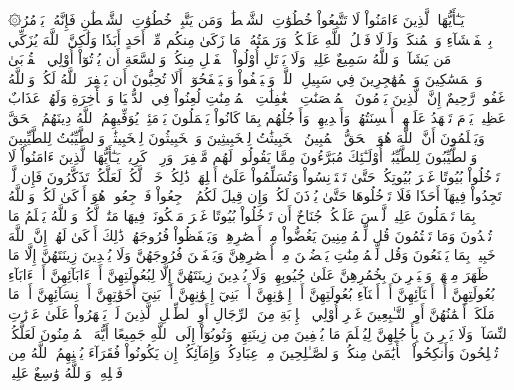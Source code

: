 ۞يَـٰٓأَيُّهَا ٱلَّذِينَ ءَامَنُواْ لَا تَتَّبِعُواْ خُطُوَٰتِ ٱلشَّيۡطَٰنِۚ وَمَن يَتَّبِعۡ خُطُوَٰتِ ٱلشَّيۡطَٰنِ فَإِنَّهُۥ يَأۡمُرُ بِٱلۡفَحۡشَآءِ وَٱلۡمُنكَرِۚ وَلَوۡلَا فَضۡلُ ٱللَّهِ عَلَيۡكُمۡ وَرَحۡمَتُهُۥ مَا زَكَىٰ مِنكُم مِّنۡ أَحَدٍ أَبَدٗا وَلَٰكِنَّ ٱللَّهَ يُزَكِّي مَن يَشَآءُۗ وَٱللَّهُ سَمِيعٌ عَلِيمٞ
وَلَا يَأۡتَلِ أُوْلُواْ ٱلۡفَضۡلِ مِنكُمۡ وَٱلسَّعَةِ أَن يُؤۡتُوٓاْ أُوْلِي ٱلۡقُرۡبَىٰ وَٱلۡمَسَٰكِينَ وَٱلۡمُهَٰجِرِينَ فِي سَبِيلِ ٱللَّهِۖ وَلۡيَعۡفُواْ وَلۡيَصۡفَحُوٓاْۗ أَلَا تُحِبُّونَ أَن يَغۡفِرَ ٱللَّهُ لَكُمۡۚ وَٱللَّهُ غَفُورٞ رَّحِيمٌ
إِنَّ ٱلَّذِينَ يَرۡمُونَ ٱلۡمُحۡصَنَٰتِ ٱلۡغَٰفِلَٰتِ ٱلۡمُؤۡمِنَٰتِ لُعِنُواْ فِي ٱلدُّنۡيَا وَٱلۡأٓخِرَةِ وَلَهُمۡ عَذَابٌ عَظِيمٞ
يَوۡمَ تَشۡهَدُ عَلَيۡهِمۡ أَلۡسِنَتُهُمۡ وَأَيۡدِيهِمۡ وَأَرۡجُلُهُم بِمَا كَانُواْ يَعۡمَلُونَ
يَوۡمَئِذٖ يُوَفِّيهِمُ ٱللَّهُ دِينَهُمُ ٱلۡحَقَّ وَيَعۡلَمُونَ أَنَّ ٱللَّهَ هُوَ ٱلۡحَقُّ ٱلۡمُبِينُ
ٱلۡخَبِيثَٰتُ لِلۡخَبِيثِينَ وَٱلۡخَبِيثُونَ لِلۡخَبِيثَٰتِۖ وَٱلطَّيِّبَٰتُ لِلطَّيِّبِينَ وَٱلطَّيِّبُونَ لِلطَّيِّبَٰتِۚ أُوْلَـٰٓئِكَ مُبَرَّءُونَ مِمَّا يَقُولُونَۖ لَهُم مَّغۡفِرَةٞ وَرِزۡقٞ كَرِيمٞ
يَـٰٓأَيُّهَا ٱلَّذِينَ ءَامَنُواْ لَا تَدۡخُلُواْ بُيُوتًا غَيۡرَ بُيُوتِكُمۡ حَتَّىٰ تَسۡتَأۡنِسُواْ وَتُسَلِّمُواْ عَلَىٰٓ أَهۡلِهَاۚ ذَٰلِكُمۡ خَيۡرٞ لَّكُمۡ لَعَلَّكُمۡ تَذَكَّرُونَ
فَإِن لَّمۡ تَجِدُواْ فِيهَآ أَحَدٗا فَلَا تَدۡخُلُوهَا حَتَّىٰ يُؤۡذَنَ لَكُمۡۖ وَإِن قِيلَ لَكُمُ ٱرۡجِعُواْ فَٱرۡجِعُواْۖ هُوَ أَزۡكَىٰ لَكُمۡۚ وَٱللَّهُ بِمَا تَعۡمَلُونَ عَلِيمٞ
لَّيۡسَ عَلَيۡكُمۡ جُنَاحٌ أَن تَدۡخُلُواْ بُيُوتًا غَيۡرَ مَسۡكُونَةٖ فِيهَا مَتَٰعٞ لَّكُمۡۚ وَٱللَّهُ يَعۡلَمُ مَا تُبۡدُونَ وَمَا تَكۡتُمُونَ
قُل لِّلۡمُؤۡمِنِينَ يَغُضُّواْ مِنۡ أَبۡصَٰرِهِمۡ وَيَحۡفَظُواْ فُرُوجَهُمۡۚ ذَٰلِكَ أَزۡكَىٰ لَهُمۡۚ إِنَّ ٱللَّهَ خَبِيرُۢ بِمَا يَصۡنَعُونَ
وَقُل لِّلۡمُؤۡمِنَٰتِ يَغۡضُضۡنَ مِنۡ أَبۡصَٰرِهِنَّ وَيَحۡفَظۡنَ فُرُوجَهُنَّ وَلَا يُبۡدِينَ زِينَتَهُنَّ إِلَّا مَا ظَهَرَ مِنۡهَاۖ وَلۡيَضۡرِبۡنَ بِخُمُرِهِنَّ عَلَىٰ جُيُوبِهِنَّۖ وَلَا يُبۡدِينَ زِينَتَهُنَّ إِلَّا لِبُعُولَتِهِنَّ أَوۡ ءَابَآئِهِنَّ أَوۡ ءَابَآءِ بُعُولَتِهِنَّ أَوۡ أَبۡنَآئِهِنَّ أَوۡ أَبۡنَآءِ بُعُولَتِهِنَّ أَوۡ إِخۡوَٰنِهِنَّ أَوۡ بَنِيٓ إِخۡوَٰنِهِنَّ أَوۡ بَنِيٓ أَخَوَٰتِهِنَّ أَوۡ نِسَآئِهِنَّ أَوۡ مَا مَلَكَتۡ أَيۡمَٰنُهُنَّ أَوِ ٱلتَّـٰبِعِينَ غَيۡرِ أُوْلِي ٱلۡإِرۡبَةِ مِنَ ٱلرِّجَالِ أَوِ ٱلطِّفۡلِ ٱلَّذِينَ لَمۡ يَظۡهَرُواْ عَلَىٰ عَوۡرَٰتِ ٱلنِّسَآءِۖ وَلَا يَضۡرِبۡنَ بِأَرۡجُلِهِنَّ لِيُعۡلَمَ مَا يُخۡفِينَ مِن زِينَتِهِنَّۚ وَتُوبُوٓاْ إِلَى ٱللَّهِ جَمِيعًا أَيُّهَ ٱلۡمُؤۡمِنُونَ لَعَلَّكُمۡ تُفۡلِحُونَ
وَأَنكِحُواْ ٱلۡأَيَٰمَىٰ مِنكُمۡ وَٱلصَّـٰلِحِينَ مِنۡ عِبَادِكُمۡ وَإِمَآئِكُمۡۚ إِن يَكُونُواْ فُقَرَآءَ يُغۡنِهِمُ ٱللَّهُ مِن فَضۡلِهِۦۗ وَٱللَّهُ وَٰسِعٌ عَلِيمٞ
